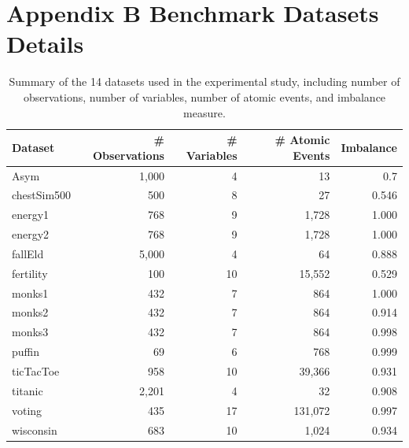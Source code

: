 \documentclass[preprint,12pt]{elsarticle}
\begin{document}
\section*{Appendix B Benchmark Datasets Details}
\begin{table}[H]
\footnotesize
\centering
\caption{Summary of the 14 datasets used in the experimental study, including number of observations, number of variables, number of atomic events, and imbalance measure.}
\label{tab:dataset_summary}
\vspace{0.3em}

\begin{tabular}{lrrrr}
\toprule
Dataset        & \# Observations & \# Variables & \# Atomic Events & Imbalance \\
\midrule
Asym           & 1{,}000& 4  & 13    & 0.7 \\
chestSim500    & 500    & 8  & 27    & 0.546 \\
energy1        & 768    & 9  & 1{,}728    & 1.000 \\
energy2        & 768    & 9  & 1{,}728    & 1.000 \\
fallEld        & 5{,}000  & 4  & 64        & 0.888 \\
fertility      & 100    & 10 & 15{,}552   & 0.529 \\
monks1         & 432    & 7  & 864       & 1.000 \\
monks2         & 432    & 7  & 864       & 0.914 \\
monks3         & 432    & 7  & 864       & 0.998 \\
puffin         & 69     & 6  & 768       & 0.999 \\
ticTacToe      & 958    & 10 & 39{,}366   & 0.931 \\
titanic        & 2{,}201  & 4  & 32        & 0.908 \\
voting         & 435    & 17 & 131{,}072  & 0.997 \\
wisconsin      & 683    & 10 & 1{,}024    & 0.934 \\
\bottomrule
\end{tabular}
\end{table}
\end{document}
